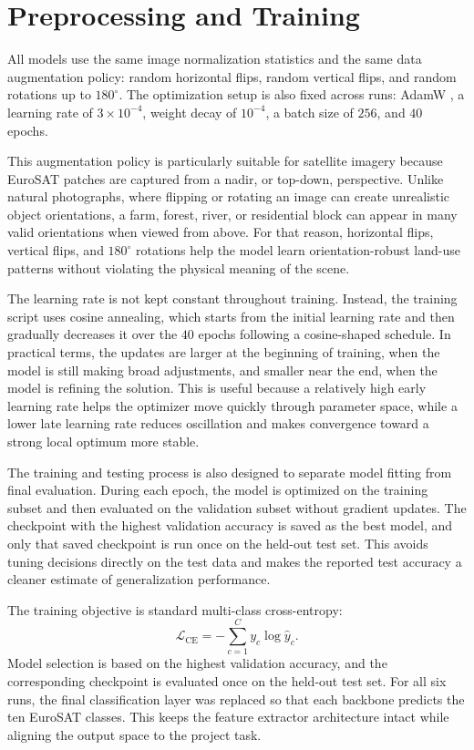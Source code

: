 \documentclass[11pt]{report}
\begin{document}
\section{Preprocessing and Training}
All models use the same image normalization statistics and the same data augmentation policy: random horizontal flips, random vertical flips, and random rotations up to \(180^\circ\). The optimization setup is also fixed across runs: AdamW \cite{loshchilov2019}, a learning rate of \(3 \times 10^{-4}\), weight decay of \(10^{-4}\), a batch size of \(256\), and \(40\) epochs.

This augmentation policy is particularly suitable for satellite imagery because EuroSAT patches are captured from a nadir, or top-down, perspective. Unlike natural photographs, where flipping or rotating an image can create unrealistic object orientations, a farm, forest, river, or residential block can appear in many valid orientations when viewed from above. For that reason, horizontal flips, vertical flips, and \(180^\circ\) rotations help the model learn orientation-robust land-use patterns without violating the physical meaning of the scene.

The learning rate is not kept constant throughout training. Instead, the training script uses cosine annealing, which starts from the initial learning rate and then gradually decreases it over the \(40\) epochs following a cosine-shaped schedule. In practical terms, the updates are larger at the beginning of training, when the model is still making broad adjustments, and smaller near the end, when the model is refining the solution. This is useful because a relatively high early learning rate helps the optimizer move quickly through parameter space, while a lower late learning rate reduces oscillation and makes convergence toward a strong local optimum more stable.

The training and testing process is also designed to separate model fitting from final evaluation. During each epoch, the model is optimized on the training subset and then evaluated on the validation subset without gradient updates. The checkpoint with the highest validation accuracy is saved as the best model, and only that saved checkpoint is run once on the held-out test set. This avoids tuning decisions directly on the test data and makes the reported test accuracy a cleaner estimate of generalization performance.

The training objective is standard multi-class cross-entropy:
\[
\mathcal{L}_{\mathrm{CE}} = -\sum_{c=1}^{C} y_c \log \hat{y}_c.
\]
Model selection is based on the highest validation accuracy, and the corresponding checkpoint is evaluated once on the held-out test set. For all six runs, the final classification layer was replaced so that each backbone predicts the ten EuroSAT classes. This keeps the feature extractor architecture intact while aligning the output space to the project task.
\end{document}
